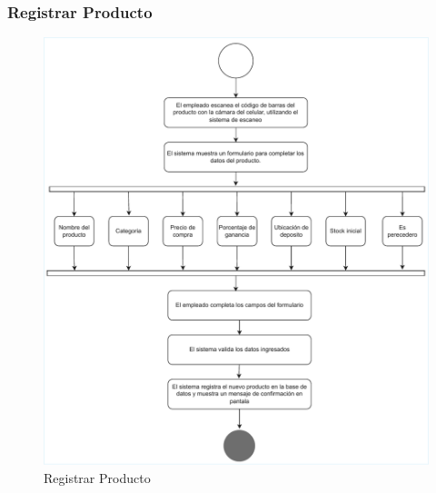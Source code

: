 \documentclass[twoside]{article}
\begin{document}
\subsubsection{Registrar Producto}
\begin{figure}[!h]
    \centering
    \includegraphics[scale=0.9]{activity2.pdf}
    \caption{Registrar Producto}
    \label{fig:enter-label}
\end{figure}
\newpage
\end{document}
